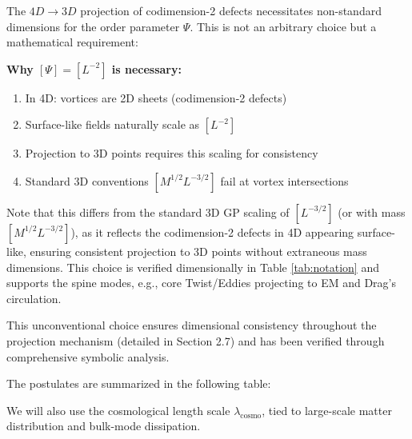 The $4D\to3D$ projection of codimension-2 defects necessitates non-standard dimensions for the order parameter $\Psi$. This is not an arbitrary choice but a mathematical requirement:

\textbf{Why $[\Psi] = [L^{-2}]$ is necessary:}
\begin{enumerate}
\item In 4D: vortices are 2D sheets (codimension-2 defects)
\item Surface-like fields naturally scale as $[L^{-2}]$
\item Projection to 3D points requires this scaling for consistency
\item Standard 3D conventions $[M^{1/2} L^{-3/2}]$ fail at vortex intersections
\end{enumerate}

Note that this differs from the standard 3D GP scaling of $[L^{-3/2}]$ (or with mass $[M^{1/2} L^{-3/2}]$), as it reflects the codimension-2 defects in 4D appearing surface-like, ensuring consistent projection to 3D points without extraneous mass dimensions. This choice is verified dimensionally in Table \ref{tab:notation} and supports the spine modes, e.g., core Twist/Eddies projecting to EM and Drag's circulation.

This unconventional choice ensures dimensional consistency throughout the projection mechanism (detailed in Section 2.7) and has been verified through comprehensive symbolic analysis.

\medskip

The postulates are summarized in the following table:

We will also use the cosmological length scale $\lambda_{\text{cosmo}}$, tied to large-scale matter distribution and bulk-mode dissipation.

